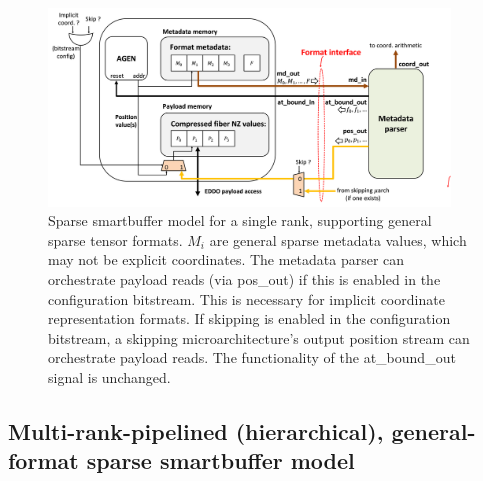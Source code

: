 \begin{figure}[ht]
    \centering
    \includegraphics[width=0.95\textwidth]{figures/single_rank_general_format_smartbuffer_model.png}
    \caption{Sparse smartbuffer model for a single rank, supporting general sparse tensor formats. ${M_i}$ are general sparse metadata values, which may not be explicit coordinates. The metadata parser can orchestrate payload reads (via pos\_out) if this is enabled in the configuration bitstream. This is necessary for implicit coordinate representation formats. If skipping is enabled in the configuration bitstream, a skipping microarchitecture's output position stream can orchestrate payload reads. The functionality of the at\_bound\_out signal is unchanged. }
    \label{fig:single_rank_general_format_smartbuffer_model}
\end{figure}

\subsection{Multi-rank-pipelined (hierarchical), general-format sparse smartbuffer model}

